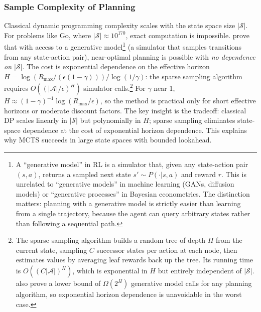 \subsubsection{Sample Complexity of Planning}

Classical dynamic programming complexity scales with the state space size $|\mathcal{S}|$. For problems like Go, where $|\mathcal{S}| \approx 10^{170}$, exact computation is impossible. \citet{kearns2002} prove that with access to a generative model\footnote{A ``generative model'' in RL is a simulator that, given any state-action pair $(s,a)$, returns a sampled next state $s' \sim P(\cdot|s,a)$ and reward $r$. This is unrelated to ``generative models'' in machine learning (GANs, diffusion models) or ``generative processes'' in Bayesian econometrics. The distinction matters: planning with a generative model is strictly easier than learning from a single trajectory, because the agent can query arbitrary states rather than following a sequential path.} (a simulator that samples transitions from any state-action pair), near-optimal planning is possible with \emph{no dependence on $|\mathcal{S}|$}. The cost is exponential dependence on the effective horizon $H = \log(R_{\max}/(\epsilon(1-\gamma))) / \log(1/\gamma)$: the sparse sampling algorithm requires $O((|\mathcal{A}|/\epsilon)^{H})$ simulator calls.\footnote{The sparse sampling algorithm builds a random tree of depth $H$ from the current state, sampling $C$ successor states per action at each node, then estimates values by averaging leaf rewards back up the tree. Its running time is $O((C|\mathcal{A}|)^H)$, which is exponential in $H$ but entirely independent of $|\mathcal{S}|$. \citet{kearns2002} also prove a lower bound of $\Omega(2^H)$ generative model calls for any planning algorithm, so exponential horizon dependence is unavoidable in the worst case.} For $\gamma$ near 1, $H \approx (1-\gamma)^{-1} \log(R_{\max}/\epsilon)$, so the method is practical only for short effective horizons or moderate discount factors. The key insight is the tradeoff: classical DP scales linearly in $|\mathcal{S}|$ but polynomially in $H$; sparse sampling eliminates state-space dependence at the cost of exponential horizon dependence. This explains why MCTS succeeds in large state spaces with bounded lookahead.

